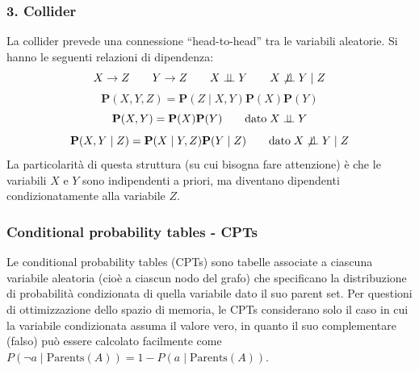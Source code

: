 \subsubsection*{3. Collider}
\begin{center}
	\begin{minipage}{0.64\textwidth}
		La collider prevede una connessione ``head-to-head'' tra le variabili aleatorie. Si hanno le seguenti
		relazioni di dipendenza:
		\[X \to Z \qquad Y \to Z \qquad X \perp \!\!\! \perp Y \qquad X \not\perp \!\!\! \perp Y \mid Z\]
		\[\textbf{P}(X, Y, Z) = \textbf{P}(Z \mid X, Y) \textbf{P}(X) \textbf{P}(Y)\]
		\[\textbf{P}(X,Y) = \textbf{P}(X) \textbf{P}(Y) \qquad \text{dato} \; X \perp \!\!\! \perp Y\]
		\[\textbf{P}(X,Y \mid Z) = \textbf{P}(X \mid Y,Z) \textbf{P}(Y \mid Z) \qquad \text{dato} \; X \not\perp \!\!\! \perp Y \mid Z\]
		La particolarità di questa struttura (su cui bisogna fare attenzione) è che le variabili \(X\) e \(Y\)
		sono indipendenti a priori, ma diventano dipendenti condizionatamente alla variabile \(Z\).
	\end{minipage}
	\begin{minipage}{0.35\textwidth}
		\centering
	\end{minipage}
\end{center}

\newpage

\subsubsection*{Conditional probability tables - CPTs}
Le conditional probability tables (CPTs) sono tabelle associate a ciascuna variabile aleatoria (cioè a ciascun nodo del grafo)
che specificano la distribuzione di probabilità condizionata di quella variabile dato il suo parent set. Per questioni di
ottimizzazione dello spazio di memoria, le CPTs considerano solo il caso in cui la variabile condizionata assuma il valore
vero, in quanto il suo complementare (falso) può essere calcolato facilmente come \(P(\neg a \mid \text{Parents}(A)) = 1 - P(a \mid \text{Parents}(A))\).

